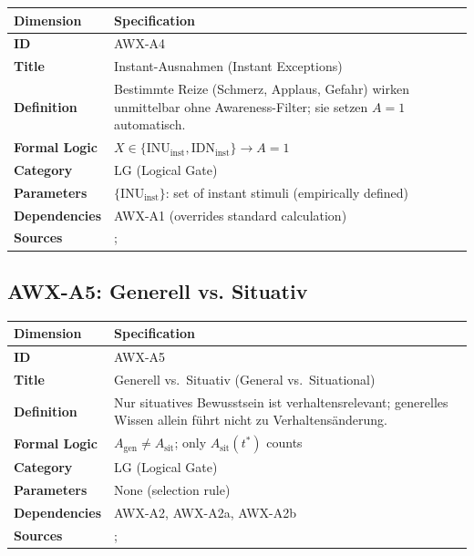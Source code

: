 \begin{table}[htbp]
\small
\begin{tabular}{p{3cm}p{11cm}}
\toprule
\textbf{Dimension} & \textbf{Specification} \\
\midrule
\textbf{ID} & AWX-A4 \\
\textbf{Title} & Instant-Ausnahmen (Instant Exceptions) \\
\textbf{Definition} & Bestimmte Reize (Schmerz, Applaus, Gefahr) wirken unmittelbar ohne Awareness-Filter; sie setzen $A = 1$ automatisch. \\
\textbf{Formal Logic} & $X \in \{\text{INU}_{\text{inst}}, \text{IDN}_{\text{inst}}\} \rightarrow A = 1$ \\
\textbf{Category} & LG (Logical Gate) \\
\textbf{Parameters} & $\{\text{INU}_{\text{inst}}\}$: set of instant stimuli (empirically defined) \\
\textbf{Dependencies} & AWX-A1 (overrides standard calculation) \\
\textbf{Sources} & \citet{kahneman2003maps}; \citet{loewenstein2001risk} \\
\bottomrule
\end{tabular}
\end{table}


\subsection{AWX-A5: Generell vs. Situativ}

\begin{table}[htbp]
\small
\begin{tabular}{p{3cm}p{11cm}}
\toprule
\textbf{Dimension} & \textbf{Specification} \\
\midrule
\textbf{ID} & AWX-A5 \\
\textbf{Title} & Generell vs.\ Situativ (General vs.\ Situational) \\
\textbf{Definition} & Nur situatives Bewusstsein ist verhaltensrelevant; generelles Wissen allein führt nicht zu Verhaltensänderung. \\
\textbf{Formal Logic} & $A_{\text{gen}} \neq A_{\text{sit}}$; only $A_{\text{sit}}(t^*)$ counts \\
\textbf{Category} & LG (Logical Gate) \\
\textbf{Parameters} & None (selection rule) \\
\textbf{Dependencies} & AWX-A2, AWX-A2a, AWX-A2b \\
\textbf{Sources} & \citet{bargh1996automaticity}; \citet{kahneman2003maps} \\
\bottomrule
\end{tabular}
\end{table}

